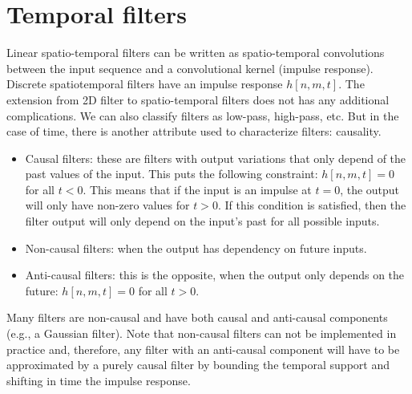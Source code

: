 \section{Temporal filters}

Linear spatio-temporal filters can be written as spatio-temporal convolutions between the input sequence and a convolutional kernel (impulse response). Discrete spatiotemporal filters have an impulse response $h \left[n,m,t \right]$. The extension from 2D filter to spatio-temporal filters does not has any additional complications. We can also classify filters as low-pass, high-pass, etc. But in the case of time, there is another attribute used to characterize filters: causality.
\begin{itemize}
    \item Causal filters: these are filters with output variations that only depend of the past values of the input. This puts the following constraint: $h \left[n,m,t \right]=0$ for all $t<0$. This means that if the input is an impulse at $t=0$, the output will only have non-zero values for $t>0$. If this condition is satisfied, then the filter output will only depend on the input's past for all possible inputs.
    \item Non-causal filters: when the output has dependency on future inputs.
    \item Anti-causal filters: this is the opposite, when the output only depends on the future: $h \left[n,m,t \right]=0$ for all $t>0$.
\end{itemize}
Many filters are non-causal and have both causal and anti-causal components (e.g., a Gaussian filter). Note that non-causal filters can not be implemented in practice and, therefore, any filter with an anti-causal component will have to be approximated by a purely causal filter by bounding the temporal support and shifting in time the impulse response.

